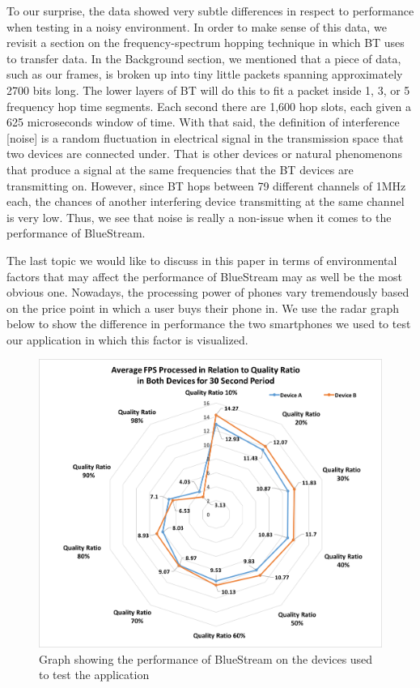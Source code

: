 \documentclass[a4paper,12pt]{article}
\begin{document}
To our surprise, the data showed very subtle differences in respect to performance when testing in a noisy environment. In order to make sense of this data, we revisit a section on the frequency-spectrum hopping technique in which BT uses to transfer data. In the Background section, we mentioned that a piece of data, such as our frames, is broken up into tiny little packets spanning approximately 2700 bits long. The lower layers of BT will do this to fit a packet inside 1, 3, or 5 frequency hop time segments. Each second there are 1,600 hop slots, each given a 625 microseconds window of time. With that said, the definition of interference [noise] is a random fluctuation in electrical signal in the transmission space that two devices are connected under. That is other devices or natural phenomenons that produce a signal at the same frequencies that the BT devices are transmitting on. However, since BT hops between 79 different channels of 1MHz each, the chances of another interfering device transmitting at the same channel is very low\cite{BlueToothRevealed}. Thus, we see that noise is really a non-issue when it comes to the performance of BlueStream. 

The last topic we would like to discuss in this paper in terms of environmental factors that may affect the performance of BlueStream may as well be the most obvious one. Nowadays, the processing power of phones vary tremendously based on the price point in which a user buys their phone in. We use the radar graph below to show the difference in performance the two smartphones we used to test our application in which this factor is visualized.

\begin{figure}[h!]
\centering
\includegraphics[scale=.5]{Figures/Figure18.png}
\caption{Graph showing the performance of BlueStream on the devices used to test the application}
\label{fig:PerformanceRadar}
\end{figure}
\end{document}
